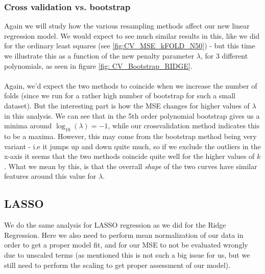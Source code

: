 \documentclass[../main.tex]{subfiles}
\begin{document}
\subsubsection{Cross validation vs. bootstrap}
Again we will study how the various resampling methods affect our new linear regression model. We would expect to see much similar results in this, like we did for the ordinary least squares (see \eqref{fig:CV_MSE_kFOLD_N50}) - but this time we illustrate this as a function of the new penalty parameter $\lambda$, for 3 different polynomials, as seen in figure \eqref{fig: CV_Bootstrap_RIDGE}.
\\\\\indent Again, we'd expect the two methods to coincide when we increase the number of folds (since we run for a rather high number of bootstrap for such a small dataset). But the interesting part is how the MSE changes for higher values of $\lambda$ in this analysis. We can see that in the 5th order polynomial bootstrap gives us a minima around $\log_{10}(\lambda)=-1$, while our crossvalidation method indicates this to be a maxima. However, this may come from the bootstrap method being very variant - i.e it jumps up and down quite much, so if we exclude the outliers in the x-axis it seems that the two methods coincide quite well for the higher values of $k$. What we mean by this, is that the overrall \emph{shape} of the two curves have similar features around this value for $\lambda$.

\subsection{LASSO}  
We do the same analysis for LASSO regression as we did for the Ridge Regression. Here we also need to perform mean normalization of our data in order to get a proper model fit, and for our MSE to not be evaluated wrongly due to unscaled terms (as mentioned this is not such a big issue for us, but we still need to perform the scaling to get proper assessment of our model). 
\end{document}
